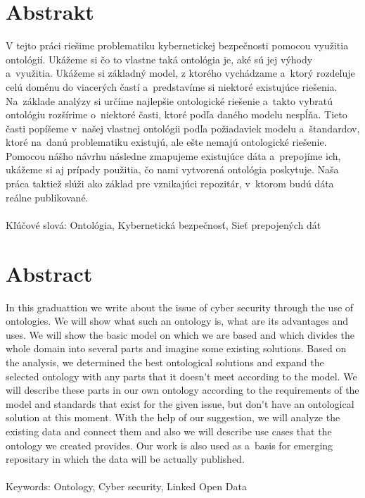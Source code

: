 \documentclass[12pt, a4paper, oneside]{book}
\begin{document}
\chapter*{Abstrakt}\label{chap:abstract_sk}
V tejto práci riešime problematiku kybernetickej bezpečnosti pomocou využitia ontológií. Ukážeme si čo to vlastne taká ontológia je, aké sú jej výhody a~využitia. Ukážeme si základný model, z ktorého vychádzame a~ktorý rozdeľuje celú doménu do viacerých častí a~predstavíme si niektoré existujúce riešenia. Na~základe analýzy si určíme najlepšie ontologické riešenie a~takto vybratú ontológiu rozšírime o~niektoré časti, ktoré podľa daného modelu nespĺňa. Tieto časti popíšeme v~našej vlastnej ontológii podľa požiadaviek modelu a~štandardov, ktoré na~danú problematiku existujú, ale ešte nemajú ontologické riešenie. Pomocou nášho návrhu následne zmapujeme existujúce dáta a~prepojíme ich, ukážeme si aj prípady použitia, čo nami vytvorená ontológia poskytuje. Naša práca taktiež slúži ako základ pre vznikajúci repozitár, v~ktorom budú dáta reálne publikované.
~\\
\\
Kľúčové slová: Ontológia, Kybernetická bezpečnosť, Sieť prepojených dát

\chapter*{Abstract}\label{chap:abstract_en}
In this graduattion we write about the issue of cyber security through the use of ontologies. We will show what such an ontology is, what are its advantages and uses. We will show the basic model on which we are based and which divides the whole domain into several parts and imagine some existing solutions. Based on the analysis, we determined the best ontological solutions and expand the selected ontology with any parts that it doesn\'{}t meet according to the model. We will describe these parts in our own ontology according to the requirements of the model and standards that exist for the given issue, but don\'{}t have an ontological solution at this moment. With the help of our suggestion, we will analyze the existing data and connect them and also we will describe use cases that the ontology we created provides. Our work is also used as a~basis for emerging repositary in which the data will be actually published.
~\\
\\
Keywords: Ontology, Cyber security, Linked Open Data
\end{document}
